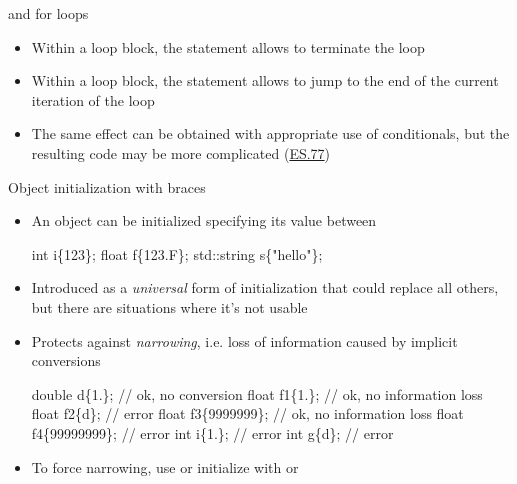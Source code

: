 \begin{frame}[fragile]{ and  for loops}

  \begin{itemize}
  \item<1-> Within a loop block, the  statement allows to terminate
    the loop
  \item<2-> Within a loop block, the  statement allows to jump to
    the end of the current iteration of the loop
  \item<3> The same effect can be obtained with appropriate use of conditionals,
    but the resulting code may be more complicated (\href{https://isocpp.github.io/CppCoreGuidelines/CppCoreGuidelines#es77-minimize-the-use-of-break-and-continue-in-loops}{ES.77})
  \end{itemize}
\end{frame}

\begin{frame}[fragile]{Object initialization with braces}

  \begin{itemize}
  \item An object can be initialized specifying its value between \code{\{\}}

    \begin{codeblock}
int i\{123\};
float f\{123.F\};
std::string s\{"hello"\};\end{codeblock}

  \item Introduced as a \textit{universal} form of initialization that could
    replace all others, but there are situations where it's not usable

  \item Protects against \textit{narrowing}, i.e. loss of information caused by
    implicit conversions

    \begin{codeblock}
double d\{1.\};         // ok, no conversion
float f1\{1.\};         // ok, no information loss
float f2\{d\};          // error
float f3\{9\textquotesingle{}999\textquotesingle{}999\};  // ok, no information loss
float f4\{99\textquotesingle{}999\textquotesingle{}999\}; // error
int i\{1.\};            // error
int g\{d\};             // error\end{codeblock}

  \item To force narrowing, use  or initialize with \code{=} or
    \code{()}
  \end{itemize}
\end{frame}

